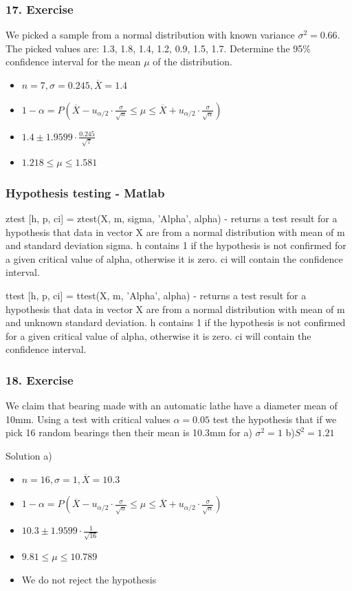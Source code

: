 \documentclass{beamer}
\begin{document}
\begin{frame}
\frametitle{17. Exercise}
We picked a sample from a normal distribution with known variance $\sigma^2 = 0.66$. The picked values are: 1.3, 1.8, 1.4, 1.2, 0.9, 1.5, 1.7. Determine the 95\% confidence interval for the mean $\mu$ of the distribution. 

\begin{itemize}
\item<2-> $n = 7, \sigma  = 0.245, \overline{X} = 1.4$
\item<3-> $1 - \alpha = P(\overline{X} - u_{\alpha/2} \cdot \frac{\sigma}{\sqrt{n}} \leq \mu \leq \overline{X} + u_{\alpha/2} \cdot \frac{\sigma}{\sqrt{n}})$
\item<4-> $1.4 \pm 1.9599 \cdot \frac{0.245}{\sqrt{7}}$
\item<5-> $1.218 \leq \mu \leq 1.581$
\end{itemize}
\end{frame}

\begin{frame}
\frametitle{Hypothesis testing - Matlab}

\begin{block}{ztest}
[h, p, ci] = ztest(X, m, sigma, 'Alpha', alpha) - returns a test result for a hypothesis that data in vector X are from a normal distribution with mean of m and standard deviation sigma. h contains 1 if the hypothesis is not confirmed for a given critical value of alpha, otherwise it is zero. ci will contain the confidence interval.
\end{block}

\begin{block}{ttest}
[h, p, ci] = ttest(X, m, 'Alpha', alpha) - returns a test result for a hypothesis that data in vector X are from a normal distribution with mean of m and unknown standard deviation. h contains 1 if the hypothesis is not confirmed for a given critical value of alpha, otherwise it is zero. ci will contain the confidence interval.
\end{block}

\end{frame}

\begin{frame}
\frametitle{18. Exercise}

We claim that bearing made with an automatic lathe have a diameter mean of 10mm. Using a test with critical values $\alpha = 0.05$ test the hypothesis that if we pick 16 random bearings then their mean is 10.3mm for a) $\sigma^2 = 1$ b)$S^2 = 1.21$ 

Solution a)
\begin{itemize}
\item<2-> $n =16, \sigma = 1, \overline{X} = 10.3$
\item<3-> $1 - \alpha = P(\overline{X} - u_{\alpha/2} \cdot \frac{\sigma}{\sqrt{n}} \leq \mu \leq \overline{X} + u_{\alpha/2} \cdot \frac{\sigma}{\sqrt{n}})$
\item<4-> $10.3 \pm 1.9599 \cdot \frac{1}{\sqrt{16}}$
\item<5-> $9.81 \leq \mu \leq 10.789$
\item<5-> We do not reject the hypothesis
\end{itemize}
\end{frame}
\end{document}
